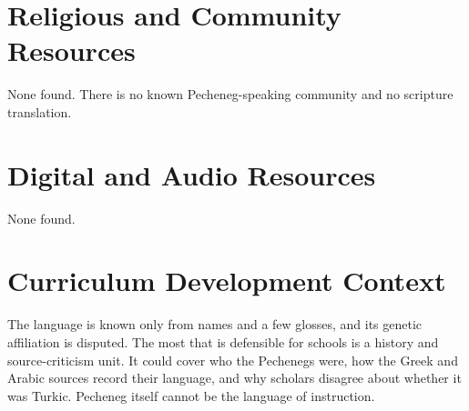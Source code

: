 \documentclass[12pt]{article}
\begin{document}
\section{Religious and Community Resources}
None found. There is no known Pecheneg-speaking community and no scripture translation.

\section{Digital and Audio Resources}
None found.

\section{Curriculum Development Context}
The language is known only from names and a few glosses, and its genetic affiliation is disputed. The most that is defensible for schools is a history and source-criticism unit. It could cover who the Pechenegs were, how the Greek and Arabic sources record their language, and why scholars disagree about whether it was Turkic. Pecheneg itself cannot be the language of instruction.
\end{document}
